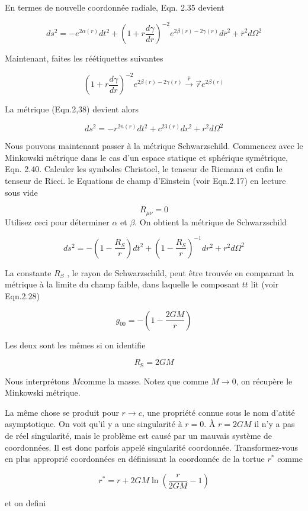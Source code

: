En termes de nouvelle coordonnée radiale, Eqn. 2.35 devient

$$
d s^{2}=-e^{2 \alpha(r)} d t^{2}+\left(1+r \frac{d \gamma}{d r}\right)^{-2} e^{2 \beta(r)-2 \gamma(r)} d \bar{r}^{2}+\bar{r}^{2} d \Omega^{2}
$$

Maintenant, faites les réétiquettes suivantes

$$
\left(1+r \frac{d \gamma}{d r}\right)^{-2} e^{2 \beta(r)-2 \gamma(r)} \stackrel{\bar{r}}{\rightarrow} \stackrel{\rightarrow}{r} e^{2 \beta(r)}
$$

La métrique (Eqn.2,38) devient alors

$$
d s^{2}=-r^{2 n(r)} d t^{2}+c^{23(r)} d r^{2}+r^{2} d \Omega^{2}
$$

Nous pouvons maintenant passer à la métrique Schwarzschild. Commencez avec le Minkowski métrique dans le cas d'un espace statique et sphérique symétrique, Eqn. 2.40. Calculer les symboles Christoel, le tenseur de Riemann et enfin le tenseur de Ricci. le Equations de champ d'Einstein (voir Eqn.2.17) en lecture sous vide


$$
R_{\mu \nu}=0
$$
Utilisez ceci pour déterminer $\alpha$ et $\beta$. On obtient la métrique de Schwarzschild

$$
d s^{2}=-\left(1-\frac{R_{S}}{r}\right) d t^{2}+\left(1-\frac{R_{S}}{r}\right)^{-1} d r^{2}+r^{2} d \Omega^{2}
$$

La constante $R_S$ , le rayon de Schwarzschild, peut être trouvée en comparant la métrique
à la limite du champ faible, dans laquelle le composant  $t t$  lit (voir Eqn.2.28)


$$
g_{00}=-\left(1-\frac{2 G M}{r}\right)
$$

Les deux sont les mêmes si on identifie

$$
R_{\mathrm{S}}=2 G M
$$


Nous interprétons $M $comme la masse. Notez que comme $M \rightarrow 0$, on récupère le Minkowski métrique.

La même chose se produit pour $r\rightarrow c$, une propriété connue sous le nom d'atité asymptotique.
On voit qu'il y a une singularité à $r = 0$. À $r = 2GM$ il n'y a pas de réel singularité, mais le problème est causé par un mauvais système de coordonnées. Il est donc
parfois appelé singularité coordonnée. Transformez-vous en plus approprié
coordonnées en définissant la coordonnée de la tortue $r^{*}$ comme

$$
r^{*}=r+2 G M \ln \left(\frac{r}{2 G M}-1\right)
$$

et on defini

